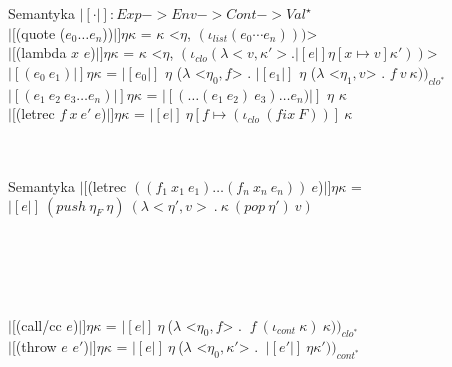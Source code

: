\documentclass[12pt,serif]{beamer}
\begin{document}
\begin{frame}{Semantyka}
$|[ \cdot |]: Exp -> Env -> Cont -> Val^{\star}$ \newline
\\
$|[$(quote ($e_0 \ldots e_n$))$|] \eta \kappa$ =
  $\kappa$ <$\eta$, $(\iota_{list} (e_0 \cdots e_n)))$> \newline
\\
$|[$(lambda $x$ $e$)$|] \eta \kappa$ =
  $\kappa$ <$\eta$, $(\iota_{clo} (\lambda <v,\kappa'>. |[e|]\eta[x \mapsto v]\kappa' ))$> \newline
\\
$|[(e_0~e_1)|] \eta \kappa$ =
  $|[e_0|]$ $\eta$ ($\lambda$ <$\eta_0, f$> .
  $|[e_1|]$ $\eta$ ($\lambda$ <$\eta_1, v$> . $f~v~\kappa))_{clo^{*}}$ \newline
\\
$|[(e_1~e_2~e_3 \ldots e_n)|] \eta \kappa$ =
  $|[ (\ldots(e_1~e_2)~e_3) \ldots e_n) |]$ $\eta$ $\kappa$ \newline
\\
$|[$(letrec $f~x~e'~e$)$|] \eta \kappa$ = $|[e|]~\eta[f \mapsto (\iota_{clo}~(fix~F))]~\kappa$ \\
\hspace{1em}{gdzie:} \\
 \\
\end{frame}

\begin{frame}{Semantyka}
\color{red}
$|[$(letrec $((f_1~x_1~e_1) \ldots (f_n~x_n~e_n)) ~e$)$|] \eta \kappa$ = \\
\hspace{1em}$|[e|]~ (push ~ \eta_F ~ \eta)~(\lambda <\eta', v> ~ . ~ \kappa ~ (pop ~\eta') ~ v)$ \\
\hspace{2em}{gdzie $\eta_F$ jest najmniejszym rozwiązaniem układu:} \\
 \\
\hspace{3em}{ $g_1 = \lambda v_1 \kappa_1 ~ . ~ |[ e_1 |] ~ \eta_F[x_1 \mapsto v_1] ~ \kappa_1 $ } \\
\hspace{4.4em}{ \vdots } \\
\hspace{3em}{ $g_n = \lambda v_n \kappa_n ~ . ~ |[ e_n |] ~ \eta_F[x_n \mapsto v_n] ~ \kappa_n $ } \newline
\\
$|[$(call/cc $e$)$|] \eta \kappa$ =
  $|[e|] ~ \eta ~ $($\lambda$ <$\eta_0, f$> .
  $~ f ~ (\iota_{cont}~{\kappa}) ~ \kappa))_{clo^{*}}$ \newline
\\
$|[$(throw $e$ $e'$)$|] \eta \kappa$ =
  $|[e|] ~ \eta ~ $($\lambda$ <$\eta_0, \kappa'$> .
  $~ |[e'|] ~ \eta \kappa'))_{cont^{*}}$ \newline


\end{frame}
\end{document}
